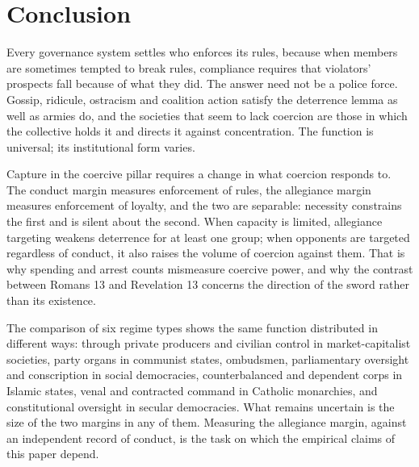 \documentclass[11pt,letterpaper]{article}
\theoremstyle{definition}
\theoremstyle{remark}
\begin{document}
\section{Conclusion}
\label{sec:conclusion}

Every governance system settles who enforces its rules, because when members are sometimes tempted to break rules, compliance requires that violators' prospects fall because of what they did. The answer need not be a police force. Gossip, ridicule, ostracism and coalition action satisfy the deterrence lemma as well as armies do, and the societies that seem to lack coercion are those in which the collective holds it and directs it against concentration. The function is universal; its institutional form varies.

Capture in the coercive pillar requires a change in what coercion responds to. The conduct margin measures enforcement of rules, the allegiance margin measures enforcement of loyalty, and the two are separable: necessity constrains the first and is silent about the second. When capacity is limited, allegiance targeting weakens deterrence for at least one group; when opponents are targeted regardless of conduct, it also raises the volume of coercion against them. That is why spending and arrest counts mismeasure coercive power, and why the contrast between Romans 13 and Revelation 13 concerns the direction of the sword rather than its existence.

The comparison of six regime types shows the same function distributed in different ways: through private producers and civilian control in market-capitalist societies, party organs in communist states, ombudsmen, parliamentary oversight and conscription in social democracies, counterbalanced and dependent corps in Islamic states, venal and contracted command in Catholic monarchies, and constitutional oversight in secular democracies. What remains uncertain is the size of the two margins in any of them. Measuring the allegiance margin, against an independent record of conduct, is the task on which the empirical claims of this paper depend.
\end{document}
